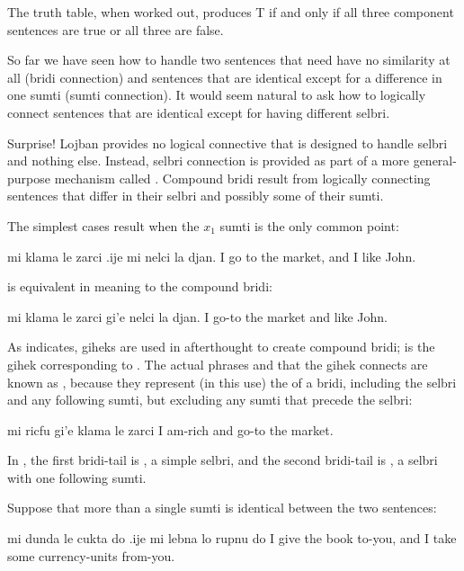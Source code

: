 The truth table, when worked out, produces T if and only if
    all three component sentences are true or all three are
    false.



So far we have seen how to handle two sentences that need
    have no similarity at all (bridi connection) and sentences that
    are identical except for a difference in one sumti (sumti
    connection). It would seem natural to ask how to logically
    connect sentences that are identical except for having
    different selbri.

Surprise! Lojban provides no logical connective that is
    designed to handle selbri and nothing else. Instead, selbri
    connection is provided as part of a more general-purpose
    mechanism called . Compound bridi result from
    logically connecting sentences that differ in their selbri and
    possibly some of their sumti.

The simplest cases result when the $x_1$ sumti is the only
    common point:
\begin{example}
mi klama le zarci .ije mi nelci la djan.\n
I go to the market, and I like John.
\end{example}

{\noindent}is equivalent in meaning to the compound bridi:
\begin{example}
mi klama le zarci gi'e nelci la djan.\n
I go-to the market and like John.
\end{example}

As  indicates, giheks are used
    in afterthought to create compound bridi;  is the gihek
    corresponding to . The actual phrases 
    and  that the gihek connects are known as
    , because they represent (in this use) the
     of a bridi, including the selbri and any following
    sumti, but excluding any sumti that precede the selbri:
\begin{example}
mi ricfu gi'e klama le zarci\n
I am-rich and go-to the market.
\end{example}

In , the first bridi-tail is
    , a simple selbri, and the second bridi-tail is
    , a selbri with one following sumti.

Suppose that more than a single sumti is identical between
    the two sentences:
\begin{example}
mi dunda le cukta do\n
\T	.ije mi lebna lo rupnu do\n
I give the book to-you,\n
\T	and I take some currency-units from-you.
\end{example}


